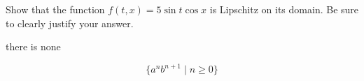 Show that the function $f(t,x) = 5\sin t \cos x$ is Lipschitz on its domain. Be sure to clearly justify your answer.

\soln there is none

\vspace{2in}
$$\{a^n b^{n+1} \mid n \geq 0\}$$